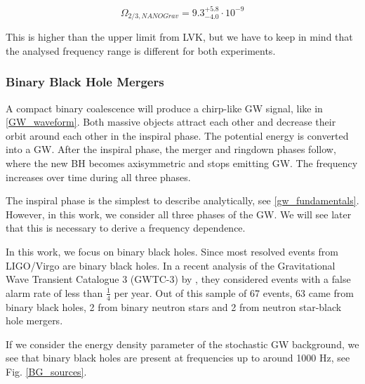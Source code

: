 \begin{equation}
    \Omega_{2/3, NANOGrav} = 9.3^{+5.8}_{-4.0}\cdot 10^{-9}
\end{equation}

This is higher than the upper limit from LVK, but we have to keep in mind that the analysed frequency range is different for both experiments.

\subsubsection{Binary Black Hole Mergers}
\label{BBH_mergers}

A compact binary coalescence will produce a chirp-like GW signal, like in \ref{GW_waveform}. Both massive objects attract each other and decrease their orbit around each other in the inspiral phase. The potential energy is converted into a GW. After the inspiral phase, the merger and ringdown phases follow, where the new BH becomes axisymmetric and stops emitting GW. The frequency increases over time during all three phases.

The inspiral phase is the simplest to describe analytically, see \ref{gw_fundamentals}. However, in this work, we consider all three phases of the GW. We will see later that this is necessary to derive a frequency dependence.


In this work, we focus on binary black holes. Since most resolved events from LIGO/Virgo are binary black holes. In a recent analysis of the Gravitational Wave Transient Catalogue 3 (GWTC-3) by \cite{the_ligo_scientific_collaboration_population_2022}, they considered events with a false alarm rate of less than $\frac{1}{4}$ per year. Out of this sample of 67 events, 63 came from binary black holes, 2 from binary neutron stars and 2 from neutron star-black hole mergers.

If we consider the energy density parameter of the stochastic GW background, we see that binary black holes are present at frequencies up to around 1000 Hz, see Fig. \ref{BG_sources}. 

